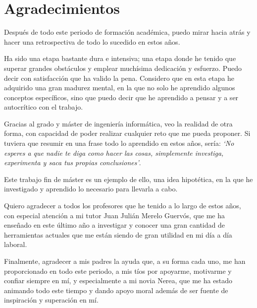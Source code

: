 \thispagestyle{empty}

\section*{Agradecimientos}

Después de todo este periodo de formación académica, puedo mirar hacia atrás y hacer una retrospectiva de todo lo sucedido en estos años.

Ha sido una etapa bastante dura e intensiva; una etapa donde he tenido que superar grandes obstáculos y emplear muchísima dedicación y esfuerzo. Puedo decir con satisfacción que ha valido la pena. Considero que en esta etapa he adquirido una gran madurez mental, en la que no solo he aprendido algunos conceptos específicos, sino que puedo decir que he aprendido a pensar y a ser autocrítico con el trabajo.

Gracias al grado y máster de ingeniería informática, veo la realidad de otra forma, con capacidad de poder realizar cualquier reto que me pueda proponer. Si tuviera que resumir en una frase todo lo aprendido en estos años, sería: \textit{`No esperes a que nadie te diga como hacer las cosas, simplemente investiga, experimenta y saca tus propias conclusiones'}.

Este trabajo fin de máster es un ejemplo de ello, una idea hipotética, en la que he investigado y aprendido lo necesario para llevarla a cabo.

Quiero agradecer a todos los profesores que he tenido a lo largo de estos años, con especial atención a mi tutor Juan Julián Merelo Guervós, que me ha enseñado en este último año a investigar y conocer una gran cantidad de herramientas actuales que me están siendo de gran utilidad en mi día a día laboral.

Finalmente, agradecer a mis padres la ayuda que, a su forma cada uno, me han proporcionado
en todo este periodo, a mis tíos por apoyarme, motivarme y confiar siempre en mí, y
especialmente a mi novia Nerea, que me ha estado animando todo este tiempo y dando apoyo
moral además de ser fuente de inspiración y superación en mí.

\newpage
